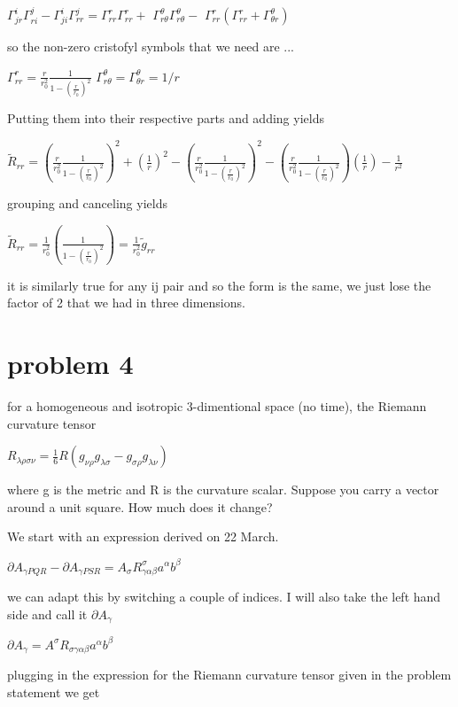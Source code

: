 \documentclass{article}
\begin{document}
$\Gamma^{i}_{jr}\Gamma^{j}_{ri}-\Gamma^{i}_{ji}\Gamma^{j}_{rr}=\Gamma^{r}_{rr}\Gamma^{r}_{rr}+$
$\Gamma^{\theta}_{r\theta}\Gamma^{\theta}_{r\theta}-$
$\Gamma^{r}_{rr}(\Gamma^{r}_{rr}+\Gamma^{\theta}_{\theta r})$

so the non-zero cristofyl symbols that we need are ...

$\Gamma^{r}_{rr}=\frac{r}{r_{0}^{2}}\frac{1}{1-(\frac{r}{r_{0}})^{2}}$
$\Gamma^{\theta}_{r\theta}=\Gamma^{\theta}_{\theta r}=1/r$

Putting them into their respective parts and adding yields

$\tilde{R}_{rr}=(\frac{r}{r_{0}^{2}}\frac{1}{1-(\frac{r}{r_{0}})^{2}})^{2}+(\frac{1}{r})^{2}-(\frac{r}{r_{0}^{2}}\frac{1}{1-(\frac{r}{r_{0}})^{2}})^{2}-(\frac{r}{r_{0}^{2}}\frac{1}{1-(\frac{r}{r_{0}})^{2}})(\frac{1}{r})-\frac{1}{r^{2}}$

grouping and canceling yields 

$\tilde{R}_{rr}=\frac{1}{r_{0}^{2}}(\frac{1}{1-(\frac{r}{r_{0}})^{2}})=\frac{1}{r_{0}^{2}}\tilde{g}_{rr}$

it is similarly true for any ij pair and so the form is the same, we just lose the factor of 2 that we had in three dimensions. 

\newpage 

\section{problem 4}
for a homogeneous and isotropic 3-dimentional space (no time), the Riemann curvature tensor

\begin{center}
$R_{\lambda\rho\sigma\nu}=\frac{1}{6}R(g_{\nu\rho}g_{\lambda\sigma}-g_{\sigma\rho}g_{\lambda\nu})$
\end{center}

where g is the metric and R is the curvature scalar. Suppose you carry a vector around a unit square. How much does it change?

We start with an expression derived on 22 March. 

$\partial A_{\gamma PQR}-\partial A_{\gamma PSR}=A_{\sigma}R^{\sigma}_{\gamma\alpha\beta}a^{\alpha}b^{\beta}$

we can adapt this by switching a couple of indices. I will also take the left hand side and call it $\partial A_{\gamma}$

$\partial A_{\gamma}=A^{\sigma}R_{\sigma\gamma\alpha\beta}a^{\alpha}b^{\beta}$

plugging in the expression for the Riemann curvature tensor given in the problem statement we get 
\end{document}
